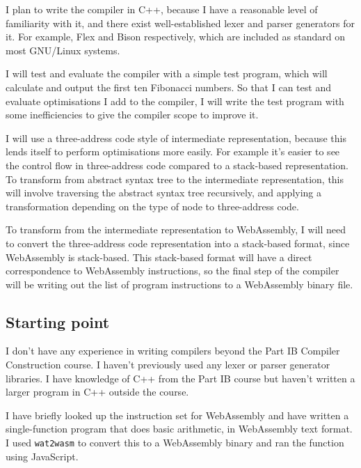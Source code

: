 I plan to write the compiler in C++, because I have a reasonable level of familiarity with it, and there exist well-established lexer and parser generators for it. For example, Flex and Bison respectively, which are included as standard on most GNU/Linux systems.

I will test and evaluate the compiler with a simple test program, which will calculate and output the first ten Fibonacci numbers. So that I can test and evaluate optimisations I add to the compiler, I will write the test program with some inefficiencies to give the compiler scope to improve it.



I will use a three-address code style of intermediate representation, because this lends itself to perform optimisations more easily. For example it's easier to see the control flow in three-address code compared to a stack-based representation.
To transform from abstract syntax tree to the intermediate representation, this will involve traversing the abstract syntax tree recursively, and applying a transformation depending on the type of node to three-address code.



To transform from the intermediate representation to WebAssembly, I will need to convert the three-address code representation into a stack-based format, since WebAssembly is stack-based. This stack-based format will have a direct correspondence to WebAssembly instructions, so the final step of the compiler will be writing out the list of program instructions to a WebAssembly binary file.





\subsection*{Starting point}

I don't have any experience in writing compilers beyond the Part IB Compiler Construction course. I haven't previously used any lexer or parser generator libraries. I have knowledge of C++ from the Part IB course but haven't written a larger program in C++ outside the course.

I have briefly looked up the instruction set for WebAssembly and have written a single-function program that does basic arithmetic, in WebAssembly text format. I used \texttt{wat2wasm} to convert this to a WebAssembly binary and ran the function using JavaScript.

